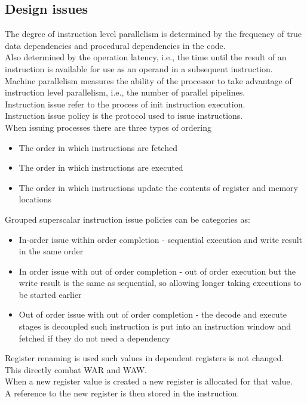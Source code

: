 \documentclass[12pt, a4paper]{article}
\begin{document}
		\subsection{Design issues}
			The degree of instruction level parallelism is determined by the frequency of true data dependencies and procedural dependencies in the code.\\
			Also determined by the operation latency, i.e., the time until the result of an instruction is available for use as an operand in a subsequent instruction.\\
			Machine parallelism measures the ability of the processor to take advantage of instruction level parallelism, i.e., the number of parallel pipelines.\\
			Instruction issue refer to the process of init instruction execution.\\
			Instruction issue policy is the protocol used to issue instructions.\\
			When issuing processes there are three types of ordering
			\begin{itemize}
				\item The order in which instructions are fetched
				\item The order in which instructions are executed
				\item The order in which instructions update the contents of register and memory locations
			\end{itemize}
			Grouped superscalar instruction issue policies can be categories as:
			\begin{itemize}
				\item In-order issue within order completion - sequential execution and write result in the same order
				\item In order issue with out of order completion - out of order execution but the write result is the same as sequential, so allowing longer taking executions to be started earlier
				\item Out of order issue with out of order completion - the decode and execute stages is decoupled such instruction is put into an instruction window and fetched if they do not need a dependency
			\end{itemize}
			Register renaming is used such values in dependent registers is not changed.\\
			This directly combat WAR and WAW.\\
			When a new register value is created a new register is allocated for that value.\\
			A reference to the new register is then stored in the instruction.
\end{document}
